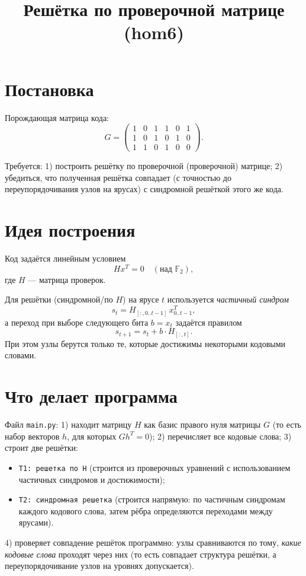 \documentclass[12pt]{article}
\title{Решётка по проверочной матрице (hom6)}
\author{}
\date{}
\begin{document}
\maketitle

\section*{Постановка}
Порождающая матрица кода:
\[
G=
\begin{pmatrix}
1 & 0 & 1 & 1 & 0 & 1\\
1 & 0 & 1 & 0 & 1 & 0\\
1 & 1 & 0 & 1 & 0 & 0
\end{pmatrix}.
\]

Требуется:
1) построить решётку по проверочной (проверочной) матрице;
2) убедиться, что полученная решётка совпадает (с точностью до переупорядочивания узлов на ярусах) с синдромной решёткой этого же кода.

\section*{Идея построения}
Код задаётся линейным условием
\[
H x^T = 0 \quad (\text{над } \mathbb{F}_2),
\]
где $H$ --- матрица проверок.

Для решётки (синдромной/по $H$) на ярусе $t$ используется \emph{частичный синдром}
\[
s_t = H_{[:,0..t-1]} \, x_{0..t-1}^T,
\]
а переход при выборе следующего бита $b=x_t$ задаётся правилом
\[
s_{t+1} = s_t + b \cdot H_{[:,t]}.
\]
При этом узлы берутся только те, которые достижимы некоторыми кодовыми словами.

\section*{Что делает программа}
Файл \texttt{main.py}:
1) находит матрицу $H$ как базис правого нуля матрицы $G$ (то есть набор векторов $h$, для которых $G h^T=0$);
2) перечисляет все кодовые слова;
3) строит две решётки:
   \begin{itemize}
   \item \texttt{Т1: решетка по H} (строится из проверочных уравнений с использованием частичных синдромов и достижимости);
   \item \texttt{Т2: синдромная решетка} (строится напрямую: по частичным синдромам каждого кодового слова, затем рёбра определяются переходами между ярусами).
   \end{itemize}
4) проверяет совпадение решёток программно: узлы сравниваются по тому, \emph{какие кодовые слова} проходят через них (то есть совпадает структура решётки, а переупорядочивание узлов на уровнях допускается).
\end{document}
